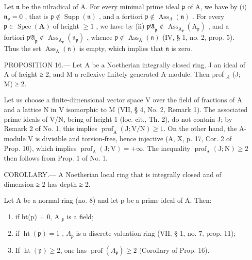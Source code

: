 Let \(\mathfrak{n}\) be the nilradical of A. For every minimal prime ideal \(\mathfrak{p}\) of A, we have by (i) \(\mathfrak{n}_{\mathfrak{p}} = 0\) , that is \(\mathfrak{p} \notin \operatorname{Supp}(\mathfrak{n})\) , and a fortiori \(\mathfrak{p} \notin \operatorname{Ass}_{\Lambda}(\mathfrak{n})\) . For every \(\mathfrak{p} \in \operatorname{Spec}(\mathbf{A})\) of height \(\geqslant 1\) , we have by (ii) \(\mathfrak{pA}_{\mathfrak{p}} \notin \operatorname{Ass}_{\mathrm{A}_{\mathfrak{p}}}(\mathrm{A}_{\mathfrak{p}})\) , and a fortiori \(\mathfrak{pA}_{\mathfrak{p}} \notin \operatorname{Ass}_{\mathrm{A}_{\mathfrak{p}}}(\mathfrak{n}_{\mathfrak{p}})\) , whence \(\mathfrak{p} \notin \operatorname{Ass}_{\mathrm{A}}(\mathfrak{n})\) (IV, § 1, no. 2, prop. 5). Thus the set \(\operatorname{Ass}_{\mathrm{A}}(\mathfrak{n})\) is empty, which implies that \(\mathfrak{n}\) is zero.

PROPOSITION 16.--- Let A be a Noetherian integrally closed ring, J an ideal of A of height ≥ 2, and M a reflexive finitely generated A-module. Then prof \(_{A}\) (J; M) ≥ 2.

Let us choose a finite-dimensional vector space V over the field of fractions of A and a lattice N in V isomorphic to M (VII, § 4, No. 2, Remark 1). The associated prime ideals of V/N, being of height 1 (loc. cit., Th. 2), do not contain J; by Remark 2 of No. 1, this implies \(\operatorname{prof}_{\mathrm{A}}(\mathrm{J};\mathrm{V}/\mathrm{N}) \geqslant 1\). On the other hand, the A-module V is divisible and torsion-free, hence injective (A, X, p. 17, Cor. 2 of Prop. 10), which implies \(\operatorname{prof}_{\mathrm{A}}(\mathrm{J};\mathrm{V}) = +\infty\). The inequality \(\operatorname{prof}_{\mathrm{A}}(\mathrm{J};\mathrm{N}) \geqslant 2\) then follows from Prop. 1 of No. 1.

COROLLARY.--- A Noetherian local ring that is integrally closed and of dimension ≥ 2 has depth ≥ 2.

Let A be a normal ring (no. 8) and let p be a prime ideal of A. Then:

\begin{enumerate}
\def\labelenumi{\alph{enumi})}
\item
  if ht(p) = 0, A \(_{p}\) is a field;
\item
  if \(\operatorname{ht}(\mathfrak{p}) = 1\) , \(A_{p}\) is a discrete valuation ring (VII, § 1, no. 7, prop. 11);
\item
  If \(\operatorname{ht}(\mathfrak{p}) \geqslant 2\), one has \(\operatorname{prof}(A_{\mathfrak{p}}) \geqslant 2\) (Corollary of Prop. 16).
\end{enumerate}

